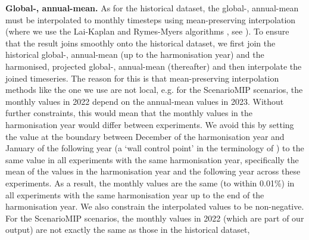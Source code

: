 \textbf{Global-, annual-mean.}
As for the historical dataset, the global-, annual-mean must be interpolated to monthly timesteps using mean-preserving interpolation
(where we use the Lai-Kaplan \citealp{lai-kaplan_algorithm_2022} and Rymes-Myers algorithms \citealp{rymes-myers_algorithm_2001},
see \citealp{nicholls_historical-ghgs_2026}).
To ensure that the result joins smoothly onto the historical dataset,
we first join the historical global-, annual-mean (up to the harmonisation year) and the harmonised, projected global-, annual-mean (thereafter)
and then interpolate the joined timeseries.
The reason for this is that mean-preserving interpolation methods like the one we use are not local,
e.g. for the ScenarioMIP scenarios, the monthly values in 2022 depend on the annual-mean values in 2023.
Without further constraints, this would mean that the monthly values in the harmonisation year would differ between experiments.
We avoid this by setting the value at the boundary between December of the harmonisation year and January of the following year
(a `wall control point' in the terminology of \citealp{lai-kaplan_algorithm_2022})
to the same value in all experiments with the same harmonisation year,
specifically the mean of the values in the harmonisation year and the following year across these experiments.
As a result, the monthly values are the same (to within 0.01\%)
in all experiments with the same harmonisation year up to the end of the harmonisation year.
We also constrain the interpolated values to be non-negative.
For the ScenarioMIP scenarios, the monthly values in 2022 (which are part of our output) are not exactly the same as those in the historical dataset,
